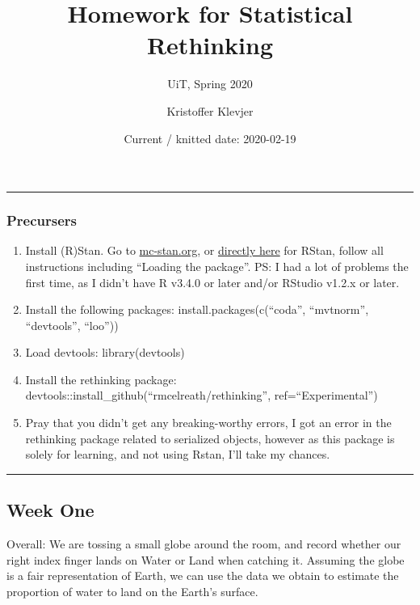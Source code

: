 \documentclass[]{article}
\title{Homework for Statistical Rethinking}
\subtitle{UiT, Spring 2020}
\author{Kristoffer Klevjer}
\date{Current / knitted date: 2020-02-19}
\providecommand{\tightlist}{%
  \setlength{\itemsep}{0pt}\setlength{\parskip}{0pt}}
\begin{document}
\maketitle

\begin{center}\rule{0.5\linewidth}{\linethickness}\end{center}

\hypertarget{precursers}{%
\subsubsection{Precursers}\label{precursers}}

\begin{enumerate}
\def\labelenumi{\arabic{enumi})}
\tightlist
\item
  Install (R)Stan. Go to \url{mc-stan.org}, or
  \href{https://github.com/stan-dev/rstan/wiki/RStan-Getting-Started}{directly
  here} for RStan, follow all instructions including ``Loading the
  package''. PS: I had a lot of problems the first time, as I didn't
  have R v3.4.0 or later and/or RStudio v1.2.x or later.
\item
  Install the following packages: install.packages(c(``coda'',
  ``mvtnorm'', ``devtools'', ``loo''))
\item
  Load devtools: library(devtools)
\item
  Install the rethinking package:
  devtools::install\_github(``rmcelreath/rethinking'',
  ref=``Experimental'')
\item
  Pray that you didn't get any breaking-worthy errors, I got an error in
  the rethinking package related to serialized objects, however as this
  package is solely for learning, and not using Rstan, I'll take my
  chances.
\end{enumerate}

\begin{center}\rule{0.5\linewidth}{\linethickness}\end{center}

\hypertarget{week-one}{%
\subsection{Week One}\label{week-one}}

Overall: We are tossing a small globe around the room, and record
whether our right index finger lands on Water or Land when catching it.
Assuming the globe is a fair representation of Earth, we can use the
data we obtain to estimate the proportion of water to land on the
Earth's surface.
\end{document}

